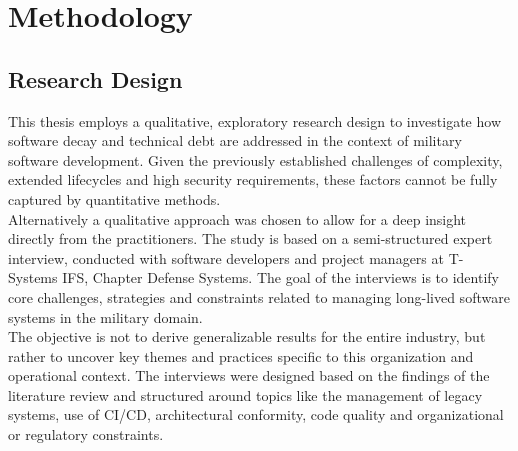 \section{Methodology}
\subsection{Research Design}
This thesis employs a qualitative, exploratory research design to investigate how software decay and technical debt are addressed in the context of military software development. Given the previously established challenges of complexity, extended lifecycles and high security requirements, these factors
cannot be fully captured by quantitative methods.\\
Alternatively a qualitative approach was chosen to allow for a deep insight directly from the practitioners. The study is based on a semi-structured expert interview, conducted with software developers and project managers at T-Systems IFS, Chapter Defense Systems. 
The goal of the interviews is to identify core challenges, strategies and constraints related to managing long-lived software systems in the military domain.\\
The objective is not to derive generalizable results for the entire industry, but rather to uncover key themes and practices specific to this organization and operational context. The interviews were designed based on the findings of the literature review and structured around topics like
the management of legacy systems, use of \ac{CI/CD}, architectural conformity, code quality and organizational or regulatory constraints.\\
